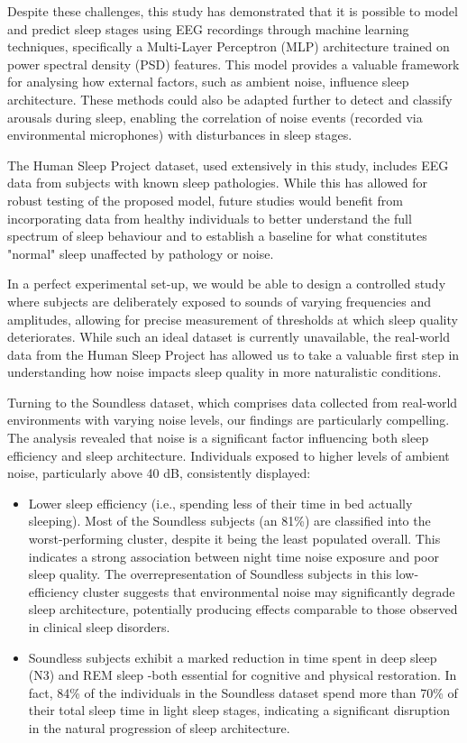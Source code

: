 Despite these challenges, this study has demonstrated that it is possible to model and predict sleep stages using EEG recordings through machine learning techniques, specifically a Multi-Layer Perceptron (MLP) architecture trained on power spectral density (PSD) features. This model provides a valuable framework for analysing how external factors, such as ambient noise, influence sleep architecture. These methods could also be adapted further to detect and classify arousals during sleep, enabling the correlation of noise events (recorded via environmental microphones) with disturbances in sleep stages.

The Human Sleep Project dataset, used extensively in this study, includes EEG data from subjects with known sleep pathologies. While this has allowed for robust testing of the proposed model, future studies would benefit from incorporating data from healthy individuals to better understand the full spectrum of sleep behaviour and to establish a baseline for what constitutes "normal" sleep unaffected by pathology or noise.

In a perfect experimental set-up, we would be able to design a controlled study where subjects are deliberately exposed to sounds of varying frequencies and amplitudes, allowing for precise measurement of thresholds at which sleep quality deteriorates. While such an ideal dataset is currently unavailable, the real-world data from the Human Sleep Project has allowed us to take a valuable first step in understanding how noise impacts sleep quality in more naturalistic conditions.

Turning to the Soundless dataset, which comprises data collected from real-world environments with varying noise levels, our findings are particularly compelling. The analysis revealed that noise is a significant factor influencing both sleep efficiency and sleep architecture. Individuals exposed to higher levels of ambient noise, particularly above 40 dB, consistently displayed:

\begin{itemize}
	\item Lower sleep efficiency (i.e., spending less of their time in bed actually sleeping). Most of the Soundless subjects (an 81\%) are classified into the worst-performing cluster, despite it being the least populated overall. This indicates a strong association between night time noise exposure and poor sleep quality. The overrepresentation of Soundless subjects in this low-efficiency cluster suggests that environmental noise may significantly degrade sleep architecture, potentially producing effects comparable to those observed in clinical sleep disorders.
	\item Soundless subjects exhibit a marked reduction in time spent in deep sleep (N3) and REM sleep -both essential for cognitive and physical restoration. In fact, 84\% of the individuals in the Soundless dataset spend more than 70\% of their total sleep time in light sleep stages, indicating a significant disruption in the natural progression of sleep architecture.   
\end{itemize}

